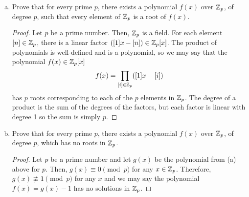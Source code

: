 \documentclass{agony}
\begin{document}
\question \begin{enumerate}[(a)]
  \item Prove that for every prime $p$, there exists a polynomial $f(x)$ over $\mathbb{Z}_p$,
        of degree $p$, such that every element of $\mathbb{Z}_p$ is a root of $f(x)$.
        \begin{proof}
          Let $p$ be a prime number.
          Then, $\mathbb{Z}_p$ is a field.
          For each element $[n] \in \mathbb{Z}_p$, there is a linear factor $([1]x - [n]) \in \mathbb{Z}_p[x]$.
          The product of polynomials is well-defined and is a polynomial, so we may say that
          the polynomial $f(x) \in \mathbb{Z}_p[x]$ \[ f(x) = \prod_{[i] \in \mathbb{Z}_p}([1]x - [i]) \]
          has $p$ roots corresponding to each of the $p$ elements in $\mathbb{Z}_p$.
          The degree of a product is the sum of the degrees of the factors,
          but each factor is linear with degree 1 so the sum is simply $p$.
        \end{proof}
  \item Prove that for every prime $p$, there exists a polynomial $f(x)$ over $\mathbb{Z}_p$,
        of degree $p$, which has no roots in $\mathbb{Z}_p$.
        \begin{proof}
          Let $p$ be a prime number and let $g(x)$ be the polynomial from (a) above for $p$.
          Then, $g(x) \equiv 0 \pmod p$ for any $x \in \mathbb{Z}_p$.
          Therefore, $g(x) \not\equiv 1 \pmod p$ for any $x$ and we may say the polynomial
          $f(x) = g(x) - 1$ has no solutions in $\mathbb{Z}_p$.
        \end{proof}
\end{enumerate}
\end{document}
